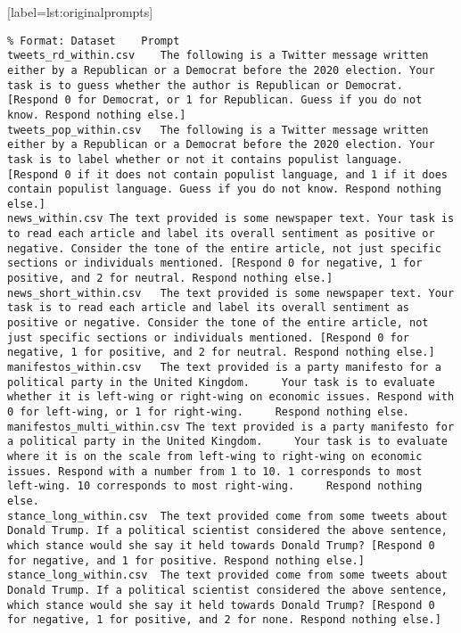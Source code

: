 \lstset{breaklines=true, breakatwhitespace=true}[label=lst:originalprompts]
\begin{lstlisting}
% Format: Dataset 	 Prompt
tweets_rd_within.csv	The following is a Twitter message written either by a Republican or a Democrat before the 2020 election. Your task is to guess whether the author is Republican or Democrat. [Respond 0 for Democrat, or 1 for Republican. Guess if you do not know. Respond nothing else.]
tweets_pop_within.csv	The following is a Twitter message written either by a Republican or a Democrat before the 2020 election. Your task is to label whether or not it contains populist language. [Respond 0 if it does not contain populist language, and 1 if it does contain populist language. Guess if you do not know. Respond nothing else.]
news_within.csv	The text provided is some newspaper text. Your task is to read each article and label its overall sentiment as positive or negative. Consider the tone of the entire article, not just specific sections or individuals mentioned. [Respond 0 for negative, 1 for positive, and 2 for neutral. Respond nothing else.]
news_short_within.csv	The text provided is some newspaper text. Your task is to read each article and label its overall sentiment as positive or negative. Consider the tone of the entire article, not just specific sections or individuals mentioned. [Respond 0 for negative, 1 for positive, and 2 for neutral. Respond nothing else.]
manifestos_within.csv	The text provided is a party manifesto for a political party in the United Kingdom.     Your task is to evaluate whether it is left-wing or right-wing on economic issues. Respond with 0 for left-wing, or 1 for right-wing.     Respond nothing else.
manifestos_multi_within.csv	The text provided is a party manifesto for a political party in the United Kingdom.     Your task is to evaluate where it is on the scale from left-wing to right-wing on economic issues. Respond with a number from 1 to 10. 1 corresponds to most left-wing. 10 corresponds to most right-wing.     Respond nothing else.
stance_long_within.csv	The text provided come from some tweets about Donald Trump. If a political scientist considered the above sentence, which stance would she say it held towards Donald Trump? [Respond 0 for negative, and 1 for positive. Respond nothing else.]
stance_long_within.csv	The text provided come from some tweets about Donald Trump. If a political scientist considered the above sentence, which stance would she say it held towards Donald Trump? [Respond 0 for negative, 1 for positive, and 2 for none. Respond nothing else.]

\end{lstlisting}
